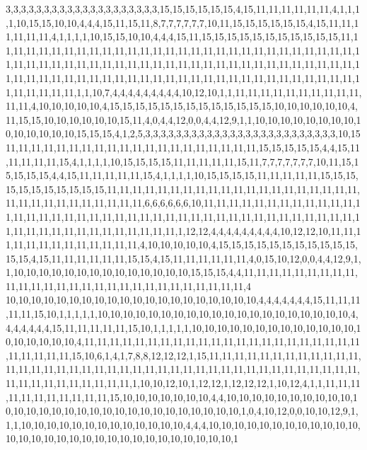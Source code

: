 3,3,3,3,3,3,3,3,3,3,3,3,3,3,3,3,3,3,3,3,15,15,15,15,15,15,4,15,11,11,11,11,11,11,4,1,1,1,1,10,15,15,10,10,4,4,4,15,11,15,11,8,7,7,7,7,7,7,10,11,15,15,15,15,15,15,4,15,11,11,11,11,11,11,4,1,1,1,1,10,15,15,10,10,4,4,4,15,11,15,15,15,15,15,15,15,15,15,15,15,11,11,11,11,11,11,11,11,11,11,11,11,11,11,11,11,11,11,11,11,11,11,11,11,11,11,11,11,11,11,11,11,11,11,11,11,11,11,11,11,11,11,11,11,11,11,11,11,11,11,11,11,11,11,11,11,11,11,11,11,11,11,11,11,11,11,11,11,11,11,11,11,11,11,11,11,11,11,11,11,11,11,11,11,11,11,11,11,11,11,11,1,1,10,7,4,4,4,4,4,4,4,4,4,10,12,10,1,1,11,11,11,11,11,11,11,11,11,11,11,11,4,10,10,10,10,10,4,15,15,15,15,15,15,15,15,15,15,15,15,15,10,10,10,10,10,10,4,11,15,15,10,10,10,10,10,10,15,11,4,0,4,4,12,0,0,4,4,12,9,1,1,10,10,10,10,10,10,10,10,10,10,10,10,10,10,15,15,15,4,1,2,5,3,3,3,3,3,3,3,3,3,3,3,3,3,3,3,3,3,3,3,3,3,3,3,3,3,10,15
11,11,11,11,11,11,11,11,11,11,11,11,11,11,11,11,11,11,11,11,15,15,15,15,15,4,4,15,11,11,11,11,11,15,4,1,1,1,1,10,15,15,15,15,11,11,11,11,11,15,11,7,7,7,7,7,7,7,10,11,15,15,15,15,15,4,4,15,11,11,11,11,11,15,4,1,1,1,1,10,15,15,15,15,11,11,11,11,11,15,15,15,15,15,15,15,15,15,15,15,11,11,11,11,11,11,11,11,11,11,11,11,11,11,11,11,11,11,11,11,11,11,11,11,11,11,11,11,11,11,11,6,6,6,6,6,6,10,11,11,11,11,11,11,11,11,11,11,11,11,11,11,11,11,11,11,11,11,11,11,11,11,11,11,11,11,11,11,11,11,11,11,11,11,11,11,11,11,11,11,11,11,11,11,11,11,11,11,11,11,11,11,1,12,12,4,4,4,4,4,4,4,4,4,10,12,12,10,11,11,11,11,11,11,11,11,11,11,11,11,11,4,10,10,10,10,10,4,15,15,15,15,15,15,15,15,15,15,15,15,15,4,15,11,11,11,11,11,11,15,15,4,15,11,11,11,11,11,11,4,0,15,10,12,0,0,4,4,12,9,1,1,10,10,10,10,10,10,10,10,10,10,10,10,10,10,15,15,15,4,4,11,11,11,11,11,11,11,11,11,11,11,11,11,11,11,11,11,11,11,11,11,11,11,11,11,11,11,11,4
10,10,10,10,10,10,10,10,10,10,10,10,10,10,10,10,10,10,10,10,4,4,4,4,4,4,4,15,11,11,11,11,11,15,10,1,1,1,1,1,10,10,10,10,10,10,10,10,10,10,10,10,10,10,10,10,10,10,10,10,4,4,4,4,4,4,4,15,11,11,11,11,11,15,10,1,1,1,1,1,10,10,10,10,10,10,10,10,10,10,10,10,10,10,10,10,10,10,10,4,11,11,11,11,11,11,11,11,11,11,11,11,11,11,11,11,11,11,11,11,11,11,11,11,11,11,11,15,10,6,1,4,1,7,8,8,12,12,12,1,15,11,11,11,11,11,11,11,11,11,11,11,11,11,11,11,11,11,11,11,11,11,11,11,11,11,11,11,11,11,11,11,11,11,11,11,11,11,11,11,11,11,11,11,11,11,11,11,11,11,11,1,10,10,12,10,1,12,12,1,12,12,12,1,10,12,4,1,1,11,11,11,11,11,11,11,11,11,11,11,15,10,10,10,10,10,10,10,4,4,10,10,10,10,10,10,10,10,10,10,10,10,10,10,10,10,10,10,10,10,10,10,10,10,10,10,10,10,10,1,0,4,10,12,0,0,10,10,12,9,1,1,1,10,10,10,10,10,10,10,10,10,10,10,10,10,4,4,4,10,10,10,10,10,10,10,10,10,10,10,10,10,10,10,10,10,10,10,10,10,10,10,10,10,10,10,10,10,10,1

